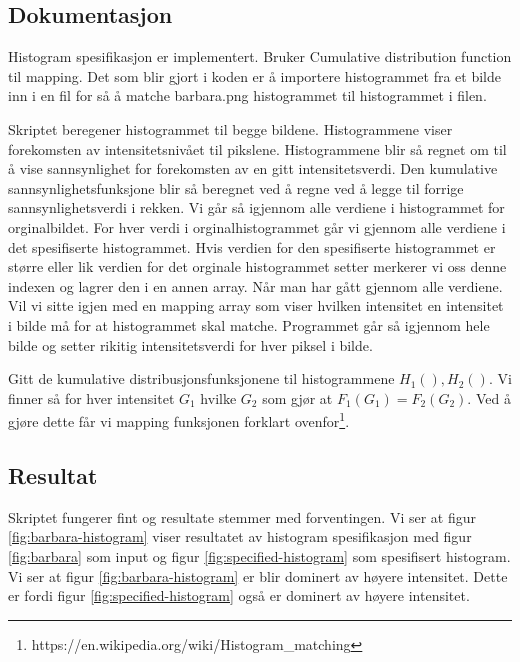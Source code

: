 \documentclass[a4paper, 12pt]{article}
\begin{document}
\subsection{Dokumentasjon}
Histogram spesifikasjon er implementert. Bruker Cumulative distribution function til mapping.
Det som blir gjort i koden er å importere histogrammet fra et bilde inn i en fil for så å matche barbara.png histogrammet til histogrammet i filen.

Skriptet beregener histogrammet til begge bildene. Histogrammene viser forekomsten av intensitetsnivået til pikslene. Histogrammene blir så regnet om til å vise sannsynlighet for forekomsten av en gitt intensitetsverdi. Den kumulative sannsynlighetsfunksjone blir så beregnet ved å regne ved å legge til forrige sannsynlighetsverdi i rekken. Vi går så igjennom alle verdiene i histogrammet for orginalbildet. For hver verdi i orginalhistogrammet går vi gjennom alle verdiene i det spesifiserte histogrammet. Hvis verdien for den spesifiserte histogrammet er større eller lik verdien for det orginale histogrammet setter merkerer vi oss denne indexen og lagrer den i en annen array. Når man har gått gjennom alle verdiene. Vil vi sitte igjen med en mapping array som viser hvilken intensitet en intensitet i bilde må for at histogrammet skal matche. Programmet går så igjennom hele bilde og setter rikitig intensitetsverdi for hver piksel i bilde.

Gitt de kumulative distribusjonsfunksjonene til histogrammene $H_1(), H_2()$.
Vi finner så for hver intensitet $G_1$ hvilke $G_2$ som gjør at $F_1(G_1) = F_2(G_2)$. Ved å gjøre dette får vi mapping funksjonen forklart ovenfor\footnote{https://en.wikipedia.org/wiki/Histogram\_matching}.

\subsection{Resultat}
Skriptet fungerer fint og resultate stemmer med forventingen. Vi ser at figur \ref{fig:barbara-histogram} viser resultatet av histogram spesifikasjon med figur \ref{fig:barbara} som input og figur \ref{fig:specified-histogram} som spesifisert histogram. Vi ser at figur \ref{fig:barbara-histogram} er blir dominert av høyere intensitet. Dette er fordi figur \ref{fig:specified-histogram} også er dominert av høyere intensitet.
\end{document}
